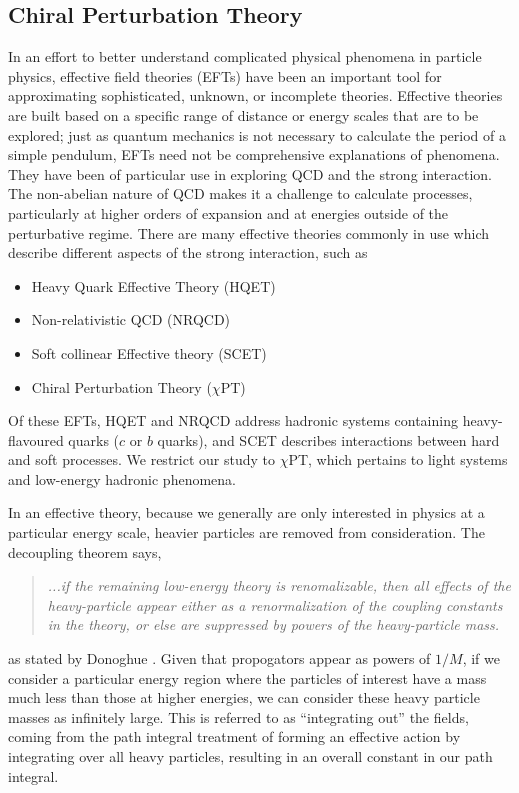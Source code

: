 \documentclass[aps,prd,onecolumn,showpacs,amsmath,amssymb,nofootinbib]{revtex4} \pdfoutput=1
\begin{document}
\subsection{Chiral Perturbation Theory}
In an effort to better understand complicated physical phenomena in particle physics, effective field theories (EFTs) have been an important tool for approximating sophisticated, unknown, or incomplete theories. Effective theories are built based on a specific range of distance or energy scales that are to be explored; just as quantum mechanics is not necessary to calculate the period of a simple pendulum, EFTs need not be comprehensive explanations of phenomena. They have been of particular use in exploring QCD and the strong interaction. The non-abelian nature of QCD makes it a challenge to calculate processes, particularly at higher orders of expansion and at energies outside of the perturbative regime. There are many effective theories commonly in use which describe different aspects of the strong interaction, such as
\begin{itemize}
    \item Heavy Quark Effective Theory (HQET)
    \item Non-relativistic QCD (NRQCD)
    \item Soft collinear Effective theory (SCET)
    \item Chiral Perturbation Theory ($\chi$PT)
\end{itemize}
Of these EFTs, HQET and NRQCD address hadronic systems containing heavy-flavoured quarks ($c$ or $b$ quarks), and SCET describes interactions between hard and soft processes. We restrict our study to $\chi$PT, which pertains to light systems and low-energy hadronic phenomena. 

In an effective theory, because we generally are only interested in physics at a particular energy scale, heavier particles are removed from consideration. The decoupling theorem says,
\begin{quote}
    \textit{...if the remaining low-energy theory is renomalizable, then all effects of the heavy-particle appear either as a renormalization of the coupling constants in the theory, or else are suppressed by powers of the heavy-particle mass.}
\end{quote}
as stated by Donoghue \cite{Donoghue1992}. Given that propogators appear as powers of $1/M$, if we consider a particular energy region where the particles of interest have a mass much less than those at higher energies, we can consider these heavy particle masses as infinitely large. This is referred to as ``integrating out'' the fields, coming from the path integral treatment of forming an effective action by integrating over all heavy particles, resulting in an overall constant in our path integral.
\end{document}
